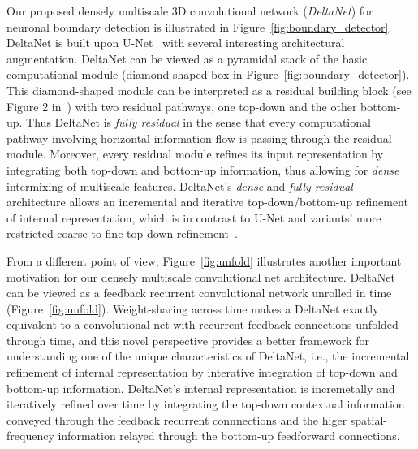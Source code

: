 \documentclass{article}
\begin{document}
Our proposed densely multiscale 3D convolutional network (\emph{DeltaNet}) for
neuronal boundary detection is illustrated in
Figure~\ref{fig:boundary_detector}. DeltaNet is built upon U-Net~\cite{unet}
with several interesting architectural augmentation. DeltaNet can be viewed as a
pyramidal stack of the basic computational module (diamond-shaped box in
Figure~\ref{fig:boundary_detector}). This diamond-shaped module can be
interpreted as a residual building block (see Figure 2 in~\cite{resnet}) with
two residual pathways, one top-down and the other bottom-up. Thus DeltaNet is
\emph{fully residual} in the sense that every computational pathway involving
horizontal information flow is passing through the residual module. Moreover,
every residual module refines its input representation by integrating both
top-down and bottom-up information, thus allowing for \emph{dense} intermixing
of multiscale features. DeltaNet's \emph{dense} and \emph{fully residual}
architecture allows an incremental and iterative top-down/bottom-up refinement
of internal representation, which is in contrast to U-Net and variants' more
restricted coarse-to-fine top-down
refinement~\cite{pinheiro2016refine,lin2016pyramid}.

From a different point of view, Figure~\ref{fig:unfold} illustrates another
important motivation for our densely multiscale convolutional net architecture.
DeltaNet can be viewed as a feedback recurrent convolutional network unrolled in
time (Figure~\ref{fig:unfold}). Weight-sharing across time makes a DeltaNet
exactly equivalent to a convolutional net with recurrent feedback connections
unfolded through time, and this novel perspective provides a better framework
for understanding one of the unique characteristics of DeltaNet, i.e., the
incremental refinement of internal representation by interative integration of
top-down and bottom-up information. DeltaNet's internal representation is
incremetally and iteratively refined over time by integrating the top-down
contextual information conveyed through the feedback recurrent connnections and
the higer spatial-frequency information relayed through the bottom-up
feedforward connections.
\end{document}
